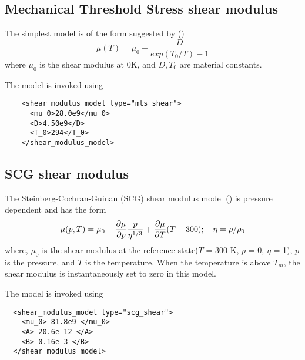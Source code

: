   \subsection{Mechanical Threshold Stress shear modulus}
  The simplest model is of the form suggested by \cite{Varshni1970} 
  (\cite{Chen1996})
  \begin{equation} \label{eq:MTSShear}
    \mu(T) = \mu_0 - \frac{D}{exp(T_0/T) - 1}
  \end{equation}
  where $\mu_0$ is the shear modulus at 0K, and $D, T_0$ are material
  constants. 

  The model is invoked using
  \lstset{language=XML}
  \begin{lstlisting}
    <shear_modulus_model type="mts_shear">
      <mu_0>28.0e9</mu_0>
      <D>4.50e9</D>
      <T_0>294</T_0>
    </shear_modulus_model>
  \end{lstlisting}

  \subsection{SCG shear modulus}
  The Steinberg-Cochran-Guinan (SCG) shear modulus 
  model (\cite{Steinberg1980,Zocher2000}) is pressure dependent and
  has the form
  \begin{equation} \label{eq:SCGShear}
    \mu(p,T) = \mu_0 + \frac{\displaystyle\partial \mu}{\displaystyle\partial p} \frac{p}{\eta^{1/3}} +
         \frac{\displaystyle\partial \mu}{\displaystyle\partial T}(T - 300) ; \quad
    \eta = \rho/\rho_0
  \end{equation}
  where, $\mu_0$ is the shear modulus at the reference state($T$ = 300 K, 
  $p$ = 0, $\eta$ = 1), $p$ is the pressure, and $T$ is the temperature.
  When the temperature is above $T_m$, the shear modulus is instantaneously
  set to zero in this model.

  The model is invoked using
  \lstset{language=XML}
  \begin{lstlisting}
  <shear_modulus_model type="scg_shear">
    <mu_0> 81.8e9 </mu_0>
    <A> 20.6e-12 </A>
    <B> 0.16e-3 </B>
  </shear_modulus_model>
  \end{lstlisting}


